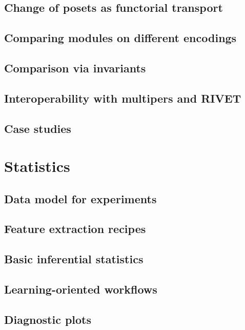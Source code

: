 \documentclass{article}
\newcommand{\<}{\langle}
\renewcommand{\>}{\rangle}
\theoremstyle{definition}
\theoremstyle{remark}
\begin{document}
	\subsection{Change of posets as functorial transport}
	
	\subsection{Comparing modules on different encodings}
	
	\subsection{Comparison via invariants}
	
	\subsection{Interoperability with multipers and RIVET}
	
	\subsection{Case studies}
	
	\section{Statistics}
	
	\subsection{Data model for experiments}
	
	\subsection{Feature extraction recipes}
	
	\subsection{Basic inferential statistics}
	
	\subsection{Learning-oriented workflows}
	
	\subsection{Diagnostic plots}
	
\end{document}
